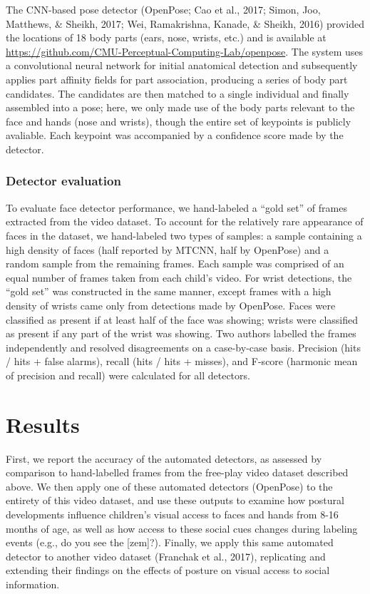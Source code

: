 \documentclass[english,man]{apa6}
\begin{document}
The CNN-based pose detector (OpenPose; Cao et al., 2017; Simon, Joo,
Matthews, \& Sheikh, 2017; Wei, Ramakrishna, Kanade, \& Sheikh, 2016)
provided the locations of 18 body parts (ears, nose, wrists, etc.) and
is available at
\url{https://github.com/CMU-Perceptual-Computing-Lab/openpose}. The
system uses a convolutional neural network for initial anatomical
detection and subsequently applies part affinity fields for part
association, producing a series of body part candidates. The candidates
are then matched to a single individual and finally assembled into a
pose; here, we only made use of the body parts relevant to the face and
hands (nose and wrists), though the entire set of keypoints is publicly
avaliable. Each keypoint was accompanied by a confidence score made by
the detector.

\subsubsection{Detector evaluation}\label{detector-evaluation}

To evaluate face detector performance, we hand-labeled a \enquote{gold
set} of frames extracted from the video dataset. To account for the
relatively rare appearance of faces in the dataset, we hand-labeled two
types of samples: a sample containing a high density of faces (half
reported by MTCNN, half by OpenPose) and a random sample from the
remaining frames. Each sample was comprised of an equal number of frames
taken from each child's video. For wrist detections, the \enquote{gold
set} was constructed in the same manner, except frames with a high
density of wrists came only from detections made by OpenPose. Faces were
classified as present if at least half of the face was showing; wrists
were classified as present if any part of the wrist was showing. Two
authors labelled the frames independently and resolved disagreements on
a case-by-case basis. Precision (hits / hits + false alarms), recall
(hits / hits + misses), and F-score (harmonic mean of precision and
recall) were calculated for all detectors.

\section{Results}\label{results}

First, we report the accuracy of the automated detectors, as assessed by
comparison to hand-labelled frames from the free-play video dataset
described above. We then apply one of these automated detectors
(OpenPose) to the entirety of this video dataset, and use these outputs
to examine how postural developments influence children's visual access
to faces and hands from 8-16 months of age, as well as how access to
these social cues changes during labeling events (e.g., do you see the
{[}zem{]}?). Finally, we apply this same automated detector to another
video dataset (Franchak et al., 2017), replicating and extending their
findings on the effects of posture on visual access to social
information.
\end{document}
